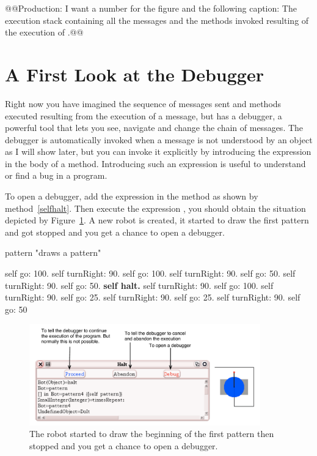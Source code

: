 @@Production: I want a number for the figure and the following caption: The execution stack containing all the messages and the methods invoked resulting of the execution of .@@ 





\section{A First Look at the Debugger}

Right now you have imagined the sequence of messages sent and methods executed resulting from the execution of a message, but \sq has a debugger, a powerful tool that lets you see, navigate and change the chain of messages. The debugger is automatically invoked when a message is not understood by an object as I will show later, but you can invoke it explicitly by introducing the expression  in the body of a method. Introducing such an expression is useful to understand or find a bug in a program. 


To open a debugger, add the expression  in the method  as shown by method~\ref{selfhalt}. Then execute the expression , you should obtain the situation depicted by Figure~\ref{fig:1DebuggerPatternHaltAnnotated}. A new robot is created, it started to draw the first pattern and got stopped and you get a chance to open a debugger. 

\begin{method}\label{selfhalt}
pattern 
   "draws a pattern"

   self go: 100.
   self turnRight: 90.
   self go: 100.
   self turnRight: 90.
   self go: 50.
   self turnRight: 90.
   self go: 50.
   \textbf{self halt.}
   self turnRight: 90.
   self go: 100.
   self turnRight: 90.
   self go: 25.
   self turnRight: 90.
   self go: 25.
   self turnRight: 90.
   self go: 50
\end{method}

\begin{figure}[h]
\centerline{\includegraphics[width=10cm]{1DebuggerPatternHaltAnnotated}}
\caption{The robot started to draw the beginning of the first pattern then stopped and  you get a chance to open a debugger. \label{fig:1DebuggerPatternHaltAnnotated}}
\end{figure}



